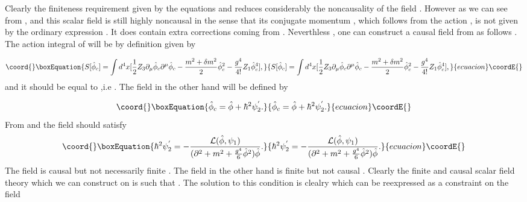 \documentclass[a4paper,12pt]{article}
\begin{document}
Clearly the finiteness requirement given by the equations
\coordHE{} and \coordHE{} reduces considerably the noncausality of the
field \myHighlight{$\hat{\phi}$}\coordHE{} . However as we can see from \coordHE{} , \coordHE{} and \coordHE{} this
scalar field is still highly noncausal in the sense that its conjugate momentum , which follows from the action \coordHE{} , is not given by the ordinary expression \coordHE{} . It does contain extra corrections coming from \coordHE{} . Neverthless , one can construct a causal
field \coordHE{} from \myHighlight{${\hat{\phi}}$}\coordHE{} as follows . The action
integral of \coordHE{} will be by definition given by

\begin{equation}\coord{}\boxEquation{
 S[{\hat{\phi}}_c]=\int d^4x[\frac{1}{2}Z_3{\partial}_{\mu}{\hat{\phi}}_c{\partial}^{\mu}{\hat{\phi}}_c -\frac{m^2+{\delta}m^2}{2}
 {\hat{\phi}}_c^2 - \frac{g^4}{4!}Z_1{\hat{\phi}}_c^4],
}{
 S[{\hat{\phi}}_c]=\int d^4x[\frac{1}{2}Z_3{\partial}_{\mu}{\hat{\phi}}_c{\partial}^{\mu}{\hat{\phi}}_c -\frac{m^2+{\delta}m^2}{2}
 {\hat{\phi}}_c^2 - \frac{g^4}{4!}Z_1{\hat{\phi}}_c^4],
}{ecuacion}\coordE{}\end{equation}
and it should be equal to \coordHE{} ,i.e \coordHE{} .
The field \myHighlight{${\hat{\phi}}$}\coordHE{} in the other hand will be defined by

\begin{equation}\coord{}\boxEquation{
{\hat{\phi}}_c={\hat{\phi}} + {\hbar}^2{\psi}_2^{'}.
}{
{\hat{\phi}}_c={\hat{\phi}} + {\hbar}^2{\psi}_2^{'}.
}{ecuacion}\coordE{}\end{equation}
From \coordHE{} and \coordHE{} the field \coordHE{} should satisfy
\begin{equation}\coord{}\boxEquation{
{\hbar}^2{\psi}^{'}_2=-\frac{{\cal
L}(\hat{\phi},{\psi}_1)}{({\partial}^2+m^2+\frac{g^4}{6}{\hat{\phi}}^2){\hat{\phi}}}.
}{
{\hbar}^2{\psi}^{'}_2=-\frac{{\cal
L}(\hat{\phi},{\psi}_1)}{({\partial}^2+m^2+\frac{g^4}{6}{\hat{\phi}}^2){\hat{\phi}}}.
}{ecuacion}\coordE{}\end{equation}
The field \coordHE{} is causal but not necessarily finite .
The field \myHighlight{$\hat{\phi}$}\coordHE{}  in the other hand is finite but not causal
. Clearly the finite and causal scalar field theory which we can
construct on \coordHE{} is such that \coordHE{} .
The solution to this condition is clealry \coordHE{} which
can be reexpressed as a constraint on the field \coordHE{}
\end{document}
